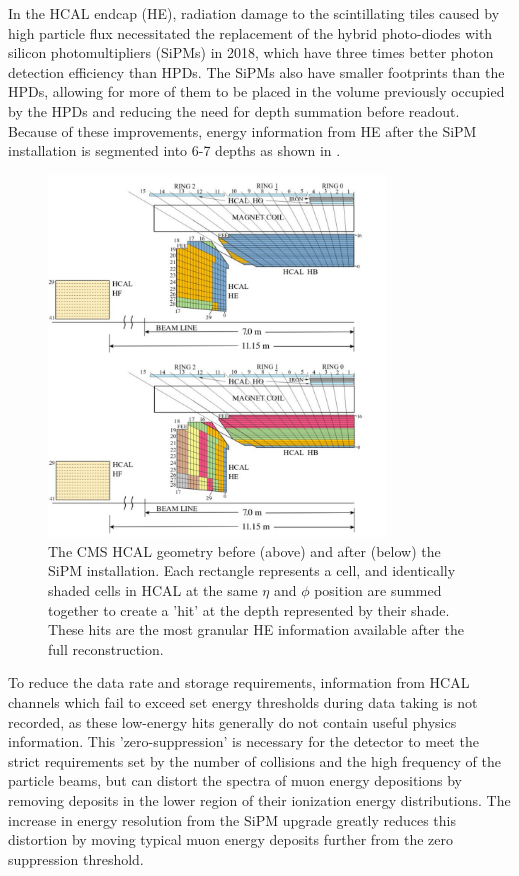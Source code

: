 In the HCAL endcap (HE), radiation damage to the scintillating tiles caused by high particle flux necessitated the replacement of the hybrid photo-diodes with silicon photomultipliers (SiPMs) in 2018, which have three times better photon detection efficiency than HPDs.  
The SiPMs also have smaller footprints than the HPDs, allowing for more of them to be placed in the volume previously occupied by the HPDs and reducing the need for depth summation before readout. 
Because of these improvements, energy information from HE after the SiPM installation is segmented into 6-7 depths as shown in .

\begin{figure}[!htpb]
	   \centering
	      \includegraphics[width=0.8\textwidth]{figures/HE_upgrade.pdf}
		 \caption[The 2018 HE upgrade]{The CMS HCAL geometry before (above) and after (below) the SiPM installation. Each rectangle represents a cell, and identically shaded cells in HCAL at the same $\eta$ and $\phi$ position are summed together to create a 'hit' at the depth represented by their shade. These hits are the most granular HE information available after the full reconstruction.}
	    \label{fig:HElayout}
\end{figure}

To reduce the data rate and storage requirements, information from HCAL channels which fail to exceed set energy thresholds during data taking is not recorded, as these low-energy hits generally do not contain useful physics information. 
This 'zero-suppression' is necessary for the detector to meet the strict requirements set by the number of collisions and the high frequency of the particle beams, but can distort the spectra of muon energy depositions by removing deposits in the lower region of their ionization energy distributions.
The increase in energy resolution from the SiPM upgrade greatly reduces this distortion by moving typical muon energy deposits further from the zero suppression threshold.
 
